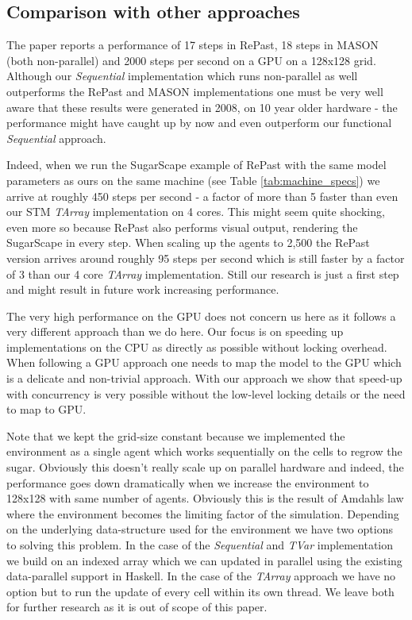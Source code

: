 \subsection{Comparison with other approaches}
The paper \cite{lysenko_framework_2008} reports a performance of 17 steps in RePast, 18 steps in MASON (both non-parallel) and 2000 steps per second on a GPU on a 128x128 grid. Although our \textit{Sequential} implementation which runs non-parallel as well outperforms the RePast and MASON implementations one must be very well aware that these results were generated in 2008, on 10 year older hardware - the performance might have caught up by now and even outperform our functional \textit{Sequential} approach. 

Indeed, when we run the SugarScape example of RePast with the same model parameters as ours on the same machine (see Table \ref{tab:machine_specs}) we arrive at roughly 450 steps per second - a factor of more than 5 faster than even our STM \textit{TArray} implementation on 4 cores. This might seem quite shocking, even more so because RePast also performs visual output, rendering the SugarScape in every step. When scaling up the agents to 2,500 the RePast version arrives around roughly 95 steps per second which is still faster by a factor of 3 than our 4 core \textit{TArray} implementation. Still our research is just a first step and might result in future work increasing performance.

The very high performance on the GPU does not concern us here as it follows a very different approach than we do here. Our focus is on speeding up implementations on the CPU as directly as possible without locking overhead. When following a GPU approach one needs to map the model to the GPU which is a delicate and non-trivial approach. With our approach we show that speed-up with concurrency is very possible without the low-level locking details or the need to map to GPU.

Note that we kept the grid-size constant because we implemented the environment as a single agent which works sequentially on the cells to regrow the sugar. Obviously this doesn't really scale up on parallel hardware and indeed, the performance goes down dramatically when we increase the environment to 128x128 with same number of agents. Obviously this is the result of Amdahls law where the environment becomes the limiting factor of the simulation. Depending on the underlying data-structure used for the environment we have two options to solving this problem. In the case of the \textit{Sequential} and \textit{TVar} implementation we build on an indexed array which we can updated in parallel using the existing data-parallel support in Haskell. In the case of the \textit{TArray} approach we have no option but to run the update of every cell within its own thread. We leave both for further research as it is out of scope of this paper. 

